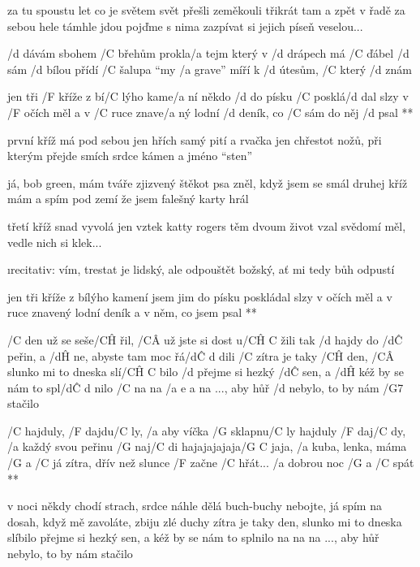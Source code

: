 za tu spoustu let co je světem svět
přešli zeměkouli třikrát tam a zpět
v řadě za sebou hele támhle jdou
pojďme s nima zazpívat si jejich píseň veselou...




/d dávám sbohem /C břehům prokla/a tejm
který v /d drápech má /C ďábel /d sám
/d bílou přídí /C šalupa ``my /a grave''
míří k /d útesům, /C který /d znám

\R jen tři /F kříže z bí/C lýho kame/a ní
   někdo /d do písku /C posklá/d dal
   slzy v /F očích měl a v /C ruce znave/a ný
   lodní /d deník, co /C sám do něj /d psal **

první kříž má pod sebou jen hřích
samý pití a rvačka jen
chřestot nožů, při kterým přejde smích
srdce kámen a jméno ``sten'' \s

já, bob green, mám tváře zjizvený
štěkot psa zněl, když jsem se smál
druhej kříž mám a spím pod zemí
že jsem falešný karty hrál \s

třetí kříž snad vyvolá jen vztek
katty rogers těm dvoum život vzal
svědomí měl, vedle nich si klek... \s

{\i recitativ:
  vím, trestat je lidský, ale odpouštět
     božský, ať mi tedy bůh odpustí}

\R jen tři kříže z bílýho kamení
   jsem jim do písku poskládal
   slzy v očích měl a v ruce znavený
   lodní deník a v něm, co jsem psal **




/C den už se seše/C\^H řil, /C\^A už jste si dost u/{C\^H C} žili
tak /d hajdy do /d\^C peřin, a /d\^H ne, abyste tam moc řá/{d\^C d} dili
/C zítra je taky /C\^H den, /C\^A slunko mi to dneska slí/{C\^H C} bilo
/d přejme si hezký /d\^C sen, a /d\^H kéž by se nám to spl/{d\^C d} nilo
/C na na /{a e a} na ..., aby hůř /d nebylo, to by nám /G7 stačilo

\R  /C hajduly, /F dajdu/C ly, /a aby víčka /G sklapnu/C ly
    hajduly /F daj/C dy, /a každý svou peřinu /G naj/C di
    hajajajajaja/{G C} jaja, /a kuba, lenka, máma /G a /C já
    zítra, dřív než slunce /F začne /C hřát...
    /a dobrou noc /G a /C spát **

v noci někdy chodí strach, srdce náhle dělá buch-buchy
nebojte, já spím na dosah, když mě zavoláte, zbiju zlé duchy
zítra je taky den, slunko mi to dneska slíbilo
přejme si hezký sen, a kéž by se nám to splnilo
na na na ..., aby hůř nebylo, to by nám stačilo

